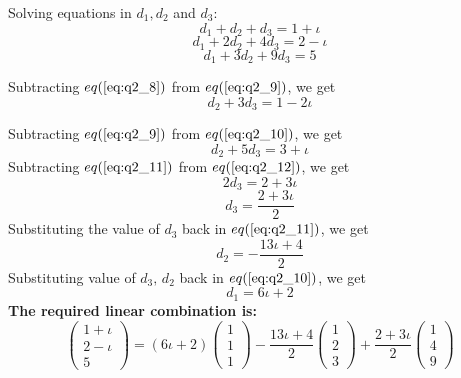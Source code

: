 \documentclass{article}
\begin{document}
Solving equations in $d_1, d_2$ and $d_3$:
\begin{equation} \label{eq:q2_8}
	d_1 + d_2 + d_3 = 1 + \iota
\end{equation}
\begin{equation} \label{eq:q2_9}
	d_1 + 2 d_2 + 4 d_3 = 2 - \iota
\end{equation}
\begin{equation} \label{eq:q2_10}
	d_1 + 3 d_2 + 9 d_3 = 5
\end{equation}

Subtracting $eq(\ref{eq:q2_8})$ from $eq(\ref{eq:q2_9})$, we get
\begin{equation} \label{eq:q2_11}
	d_2 + 3 d_3 = 1 - 2\iota
\end{equation}

Subtracting $eq(\ref{eq:q2_9})$ from $eq(\ref{eq:q2_10})$, we get
\begin{equation} \label{eq:q2_12}
	d_2 + 5 d_3 = 3 + \iota
\end{equation} 
Subtracting $eq(\ref{eq:q2_11})$ from $eq(\ref{eq:q2_12})$, we get
\begin{equation}
	2d_3 = 2 + 3 \iota
\end{equation}
\begin{equation}
	d_3 = \frac{2 + 3 \iota}{2}
\end{equation}
Substituting the value of $d_3$ back in $eq(\ref{eq:q2_11})$, we get
\begin{equation}
	d_2 = -\frac{13\iota + 4}{2}
\end{equation}
Substituting value of $d_3, \, d_2$ back in $eq(\ref{eq:q2_10})$, we get
\begin{equation}
	d_1 = 6\iota + 2
\end{equation}
\textbf{The required linear combination is:} 
\begin{equation}
	\begin{pmatrix}
	1 + \iota \\ 2 - \iota \\ 5
	\end{pmatrix}
	=
	(6\iota + 2)
	\begin{pmatrix}
	1 \\ 1 \\ 1
	\end{pmatrix}
	-\frac{13\iota + 4}{2}
	\begin{pmatrix}
	1 \\ 2 \\ 3
	\end{pmatrix}
	+
	\frac{2 + 3\iota}{2}
	\begin{pmatrix}
	1 \\ 4 \\ 9
	\end{pmatrix}
\end{equation}
 
\end{document}
